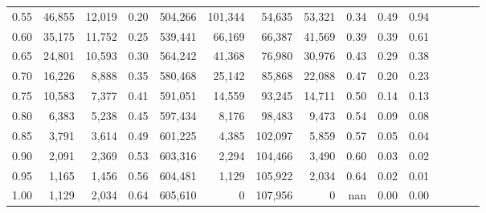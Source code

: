 \begin{tabular}{rrrcrrrrrrrrrrr}
0.55 &  46,855 &  12,019 &                                       0.20 &  504,266 &  101,344 &   54,635 &   53,321 &  0.34 &  0.49 &                         0.94 \\
0.60 &  35,175 &  11,752 &                                       0.25 &  539,441 &   66,169 &   66,387 &   41,569 &  0.39 &  0.39 &                         0.61 \\
0.65 &  24,801 &  10,593 &                                       0.30 &  564,242 &   41,368 &   76,980 &   30,976 &  0.43 &  0.29 &                         0.38 \\
0.70 &  16,226 &   8,888 &                                       0.35 &  580,468 &   25,142 &   85,868 &   22,088 &  0.47 &  0.20 &                         0.23 \\
0.75 &  10,583 &   7,377 &                                       0.41 &  591,051 &   14,559 &   93,245 &   14,711 &  0.50 &  0.14 &                         0.13 \\
0.80 &   6,383 &   5,238 &                                       0.45 &  597,434 &    8,176 &   98,483 &    9,473 &  0.54 &  0.09 &                         0.08 \\
0.85 &   3,791 &   3,614 &                                       0.49 &  601,225 &    4,385 &  102,097 &    5,859 &  0.57 &  0.05 &                         0.04 \\
0.90 &   2,091 &   2,369 &                                       0.53 &  603,316 &    2,294 &  104,466 &    3,490 &  0.60 &  0.03 &                         0.02 \\
0.95 &   1,165 &   1,456 &                                       0.56 &  604,481 &    1,129 &  105,922 &    2,034 &  0.64 &  0.02 &                         0.01 \\
1.00 &   1,129 &   2,034 &                                       0.64 &  605,610 &        0 &  107,956 &        0 &   nan &  0.00 &                         0.00 \\
\bottomrule
\end{tabular}
